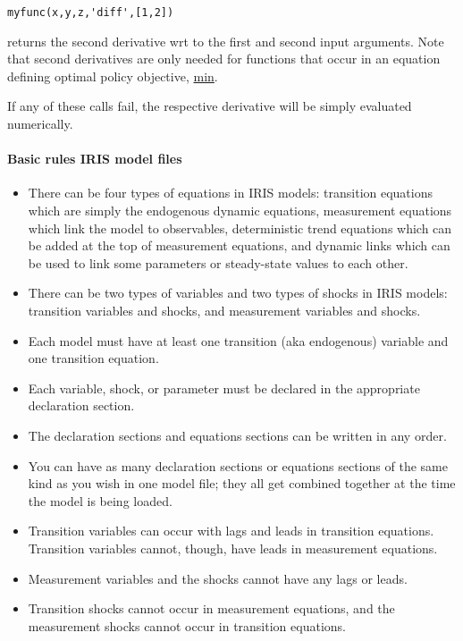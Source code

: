 \begin{verbatim}
myfunc(x,y,z,'diff',[1,2])
\end{verbatim}

returns the second derivative wrt to the first and second input
arguments. Note that second derivatives are only needed for functions
that occur in an equation defining optimal policy objective,
\href{modellang/min}{min}.

If any of these calls fail, the respective derivative will be simply
evaluated numerically.

\paragraph{Basic rules IRIS model
files}

\begin{itemize}
\item
  There can be four types of equations in IRIS models: transition
  equations which are simply the endogenous dynamic equations,
  measurement equations which link the model to observables,
  deterministic trend equations which can be added at the top of
  measurement equations, and dynamic links which can be used to link
  some parameters or steady-state values to each other.
\item
  There can be two types of variables and two types of shocks in IRIS
  models: transition variables and shocks, and measurement variables and
  shocks.
\item
  Each model must have at least one transition (aka endogenous) variable
  and one transition equation.
\item
  Each variable, shock, or parameter must be declared in the appropriate
  declaration section.
\item
  The declaration sections and equations sections can be written in any
  order.
\item
  You can have as many declaration sections or equations sections of the
  same kind as you wish in one model file; they all get combined
  together at the time the model is being loaded.
\item
  Transition variables can occur with lags and leads in transition
  equations. Transition variables cannot, though, have leads in
  measurement equations.
\item
  Measurement variables and the shocks cannot have any lags or leads.
\item
  Transition shocks cannot occur in measurement equations, and the
  measurement shocks cannot occur in transition equations.

\end{itemize}
